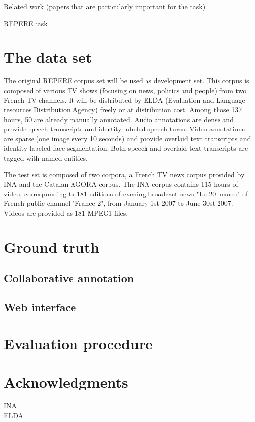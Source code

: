 \documentclass{acm_proc_article-me}
\begin{document}
Related work (papers that are particularly important for the task)

REPERE task


\section{The data set}

The original REPERE corpus set will be used as development set. This corpus is composed of various TV shows (focusing on news, politics and people) from two French TV channels. It will be distributed by ELDA (Evaluation and Language resources Distribution Agency) freely or at distribution cost. Among those 137 hours, 50 are already manually annotated. Audio annotations are dense and provide speech transcripts and identity-labeled speech turns. Video annotations are sparse (one image every 10 seconds) and provide overlaid text transcripts and identity-labeled face segmentation. Both speech and overlaid text transcripts are tagged with named entities.

The test set is composed of two corpora, a French TV news corpus provided by INA and the Catalan AGORA corpus. The INA corpus contains 115 hours of video, corresponding to 181 editions of evening broadcast news "Le 20 heures" of French public channel "France 2", from January 1st 2007 to June 30st 2007. Videos are provided as 181 MPEG1 files.


\section{Ground truth}

\subsection{Collaborative annotation}

\subsection{Web interface}

\section{Evaluation procedure}




\section{Acknowledgments}

INA \\
ELDA \\



\end{document}
